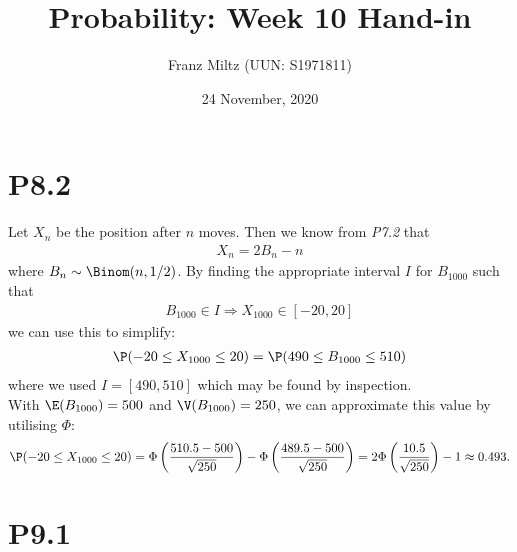 \documentclass{article}
\begin{document}
\title{Probability: Week 10 Hand-in}
\author{Franz Miltz (UUN: S1971811)}
\date{24 November, 2020}
\maketitle

\section*{P8.2}

Let $X_n$ be the position after $n$ moves. Then we know from \emph{P7.2}
that
\begin{align*}
  X_n = 2B_n-n
\end{align*}
where $B_n\sim\Binom(n,1/2)$. By finding the appropriate interval $I$
for $B_{1000}$ such that
\begin{align*}
  B_{1000}\in I\Rightarrow X_{1000}\in [-20, 20]
\end{align*}
we can use this to simplify:
\begin{align*}
  \P(-20\leq X_{1000} \leq 20) = \P(490 \leq B_{1000} \leq 510)
\end{align*}
where we used $I=[490, 510]$ which may be found by inspection.\\
With $\E(B_{1000})=500$ and $\V(B_{1000})=250$, we can approximate this value
by utilising $\Phi$:
\begin{align*}
  \P(-20\leq X_{1000} \leq 20) = \Phi\left(\frac{510.5-500}{\sqrt{250}}\right)
  - \Phi\left(\frac{489.5-500}{\sqrt{250}}\right)
  = 2\Phi\left(\frac{10.5}{\sqrt{250}}\right)-1\approx 0.493.
\end{align*}

\section*{P9.1}
\end{document}
